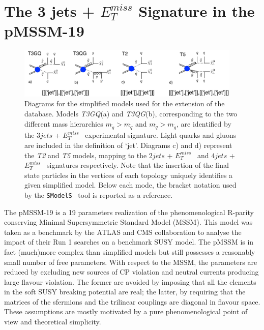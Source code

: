 \documentclass[a4paper,11pt]{article}
\newcommand{\MET}{{ $E_T ^{miss}$}}
\newcommand{\SMO}{\texttt{SModelS\xspace}}
\begin{document}
\section{The 3 jets + $E_T ^{miss}$ Signature in the pMSSM-19 }\label{sec::T3GQ}
\begin{figure}[!ht]
	\begin{center}
		\includegraphics[width=0.95\textwidth]{PLOTS/diagrams.png}
	\end{center}
	\caption{Diagrams for the simplified models used for the extension of the database. Models \textit{T3GQ}(a) and \textit{T3QG}(b), corresponding to the two different mass hierarchies $m_{\tilde g} > m_{\tilde q}$ and $m_{\tilde q} > m_{\tilde g}$, are identified by the $3jets$ + \MET~ experimental signature. Light quarks and gluons are included in the definition of `jet'. Diagrams c) and d) represent the \textit{T2} and \textit{T5} models, mapping to the $2jets$ + \MET~ and $4jets$ + \MET~  signatures respectively. Note that the insertion of the final state particles in the vertices of each topology uniquely identifies a given simplified model. Below each mode, the bracket notation used by the \SMO~ tool is reported as a reference.}
	\label{Diagrams}
\end{figure}

The pMSSM-19 is a 19 parameters realization of the phenomenological R-parity conserving Minimal Supersymmetric Standard Model (MSSM). This model was taken as a benchmark by the ATLAS\cite{Aad:2015baa} and CMS\cite{Khachatryan:2016nvf} collaboration to analyse the impact of their Run 1 searches on a benchmark SUSY model. The pMSSM is in fact (much)more complex than simplified models but still possesses a reasonably small number of free parameters. With respect to the MSSM, the parameters are reduced by excluding new sources of CP violation and neutral currents producing large flavour violation. The former are avoided by imposing that all the elements in the soft SUSY breaking potential are real; the latter, by requiring that the matrices of the sfermions and the trilinear couplings are diagonal in flavour space. These assumptions are mostly motivated by a pure phenomenological point of view and theoretical simplicity. 
\\
\end{document}
